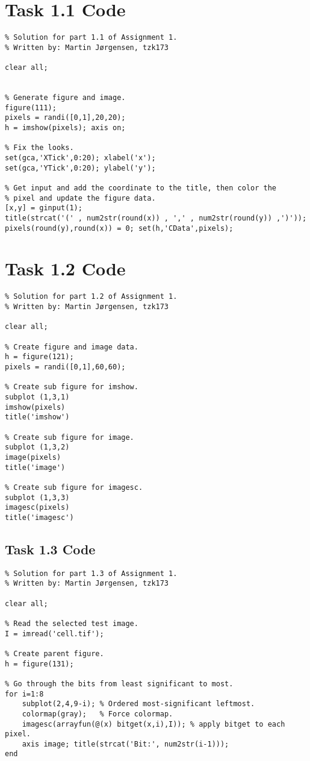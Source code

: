 \section{Task 1.1 Code}
\begin{verbatim}
% Solution for part 1.1 of Assignment 1.
% Written by: Martin Jørgensen, tzk173

clear all;


% Generate figure and image.
figure(111);
pixels = randi([0,1],20,20);
h = imshow(pixels); axis on;

% Fix the looks.
set(gca,'XTick',0:20); xlabel('x');
set(gca,'YTick',0:20); ylabel('y');

% Get input and add the coordinate to the title, then color the
% pixel and update the figure data.
[x,y] = ginput(1);
title(strcat('(' , num2str(round(x)) , ',' , num2str(round(y)) ,')'));
pixels(round(y),round(x)) = 0; set(h,'CData',pixels);
\end{verbatim}

\section{Task 1.2 Code}
\begin{verbatim}
% Solution for part 1.2 of Assignment 1.
% Written by: Martin Jørgensen, tzk173

clear all;

% Create figure and image data.
h = figure(121);
pixels = randi([0,1],60,60);

% Create sub figure for imshow.
subplot (1,3,1)
imshow(pixels)
title('imshow')

% Create sub figure for image.
subplot (1,3,2)
image(pixels)
title('image')

% Create sub figure for imagesc.
subplot (1,3,3)
imagesc(pixels)
title('imagesc')
\end{verbatim}

\subsection{Task 1.3 Code}
\begin{verbatim}
% Solution for part 1.3 of Assignment 1.
% Written by: Martin Jørgensen, tzk173

clear all;

% Read the selected test image.
I = imread('cell.tif');

% Create parent figure.
h = figure(131);

% Go through the bits from least significant to most.
for i=1:8
    subplot(2,4,9-i); % Ordered most-significant leftmost.
    colormap(gray);   % Force colormap.
    imagesc(arrayfun(@(x) bitget(x,i),I)); % apply bitget to each pixel.
    axis image; title(strcat('Bit:', num2str(i-1)));
end
\end{verbatim}

